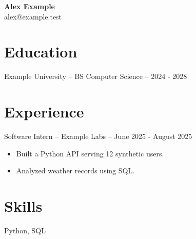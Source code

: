 \documentclass[10pt]{article}
\newcommand{\resumeItem}[1]{\item #1}
\begin{document}
\begin{center}\textbf{Alex Example}\\alex@example.test\end{center}
\section*{Education}
Example University -- BS Computer Science -- 2024 - 2028
\section*{Experience}
Software Intern -- Example Labs -- June 2025 - August 2025
\begin{itemize}
\resumeItem{Built a Python API serving 12 synthetic users.}
\resumeItem{Analyzed weather records using SQL.}
\end{itemize}
\section*{Skills}
Python, SQL
\end{document}
